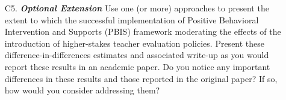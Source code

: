 \documentclass[a4paper, 11pt]{article}
\begin{document}
\begin{enumerate}
	\item[C5.] \textbf{\textit{Optional Extension}} Use one (or more) approaches to present the extent to which the successful implementation of Positive Behavioral Intervention and Supports (PBIS) framework moderating the effects of the introduction of higher-stakes teacher evaluation policies. Present these difference-in-differences estimates and associated write-up as you would report these results in an academic paper. Do you notice any important differences in these results and those reported in the original paper? If so, how would you consider addressing them?
\end{enumerate}
\end{document}
